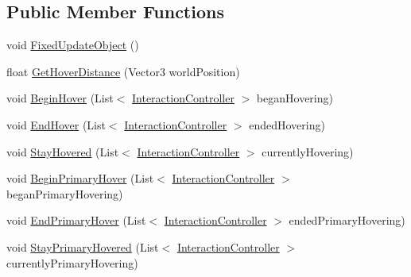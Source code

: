 \subsection*{Public Member Functions}
\begin{DoxyCompactItemize}
\item 
void \mbox{\hyperlink{interface_leap_1_1_unity_1_1_interaction_1_1_i_interaction_behaviour_ad2232cd9cc106d1077778fab592f270d}{Fixed\+Update\+Object}} ()
\item 
float \mbox{\hyperlink{interface_leap_1_1_unity_1_1_interaction_1_1_i_interaction_behaviour_a5f314b48c8c3b8f6f5067bcf5a97003c}{Get\+Hover\+Distance}} (Vector3 world\+Position)
\item 
void \mbox{\hyperlink{interface_leap_1_1_unity_1_1_interaction_1_1_i_interaction_behaviour_af4c8881fd3bc49d0ea7d09e578c571de}{Begin\+Hover}} (List$<$ \mbox{\hyperlink{class_leap_1_1_unity_1_1_interaction_1_1_interaction_controller}{Interaction\+Controller}} $>$ began\+Hovering)
\item 
void \mbox{\hyperlink{interface_leap_1_1_unity_1_1_interaction_1_1_i_interaction_behaviour_aba5485bd77f8d0a4d1af803a506f7c11}{End\+Hover}} (List$<$ \mbox{\hyperlink{class_leap_1_1_unity_1_1_interaction_1_1_interaction_controller}{Interaction\+Controller}} $>$ ended\+Hovering)
\item 
void \mbox{\hyperlink{interface_leap_1_1_unity_1_1_interaction_1_1_i_interaction_behaviour_ab9d088c65012161b3df47f3057d07e5a}{Stay\+Hovered}} (List$<$ \mbox{\hyperlink{class_leap_1_1_unity_1_1_interaction_1_1_interaction_controller}{Interaction\+Controller}} $>$ currently\+Hovering)
\item 
void \mbox{\hyperlink{interface_leap_1_1_unity_1_1_interaction_1_1_i_interaction_behaviour_ad653494de7b56532718a6b8dc3d9b412}{Begin\+Primary\+Hover}} (List$<$ \mbox{\hyperlink{class_leap_1_1_unity_1_1_interaction_1_1_interaction_controller}{Interaction\+Controller}} $>$ began\+Primary\+Hovering)
\item 
void \mbox{\hyperlink{interface_leap_1_1_unity_1_1_interaction_1_1_i_interaction_behaviour_aeb05af074ee371e099c900f2970b74d7}{End\+Primary\+Hover}} (List$<$ \mbox{\hyperlink{class_leap_1_1_unity_1_1_interaction_1_1_interaction_controller}{Interaction\+Controller}} $>$ ended\+Primary\+Hovering)
\item 
void \mbox{\hyperlink{interface_leap_1_1_unity_1_1_interaction_1_1_i_interaction_behaviour_ac761f52208454fe568478d317e6431b2}{Stay\+Primary\+Hovered}} (List$<$ \mbox{\hyperlink{class_leap_1_1_unity_1_1_interaction_1_1_interaction_controller}{Interaction\+Controller}} $>$ currently\+Primary\+Hovering)

\end{DoxyCompactItemize}
